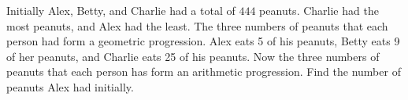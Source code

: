 Initially Alex, Betty, and Charlie had a total of $444$ peanuts. Charlie had the most peanuts, and Alex had the least. The three numbers of peanuts that each person had form a geometric progression. Alex eats 5 of his peanuts, Betty eats 9 of her peanuts, and Charlie eats 25 of his peanuts. Now the three numbers of peanuts that each person has form an arithmetic progression. Find the number of peanuts Alex had initially.